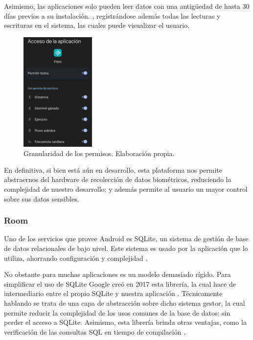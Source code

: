             
            Asimismo, las aplicaciones solo pueden leer datos con una antigüedad de 
            hasta 30 días previos a su instalación. \cite{noauthor_preguntas_nodate}, registrándose además todas las 
            lecturas y escrituras en el sistema, las cuales puede visualizar el usuario. \newline

            \begin{figure}[h]
                \centering
                \includegraphics[width=0.33\textwidth]{figures/Health connect permisos fitbit.jpg}
                \caption[Granularidad de los permisos.]
                {Granularidad de los permisos. Elaboración propia.}
                \label{figure:health_connect:granularidad_permisos}
            \end{figure}

            En definitiva, si bien está aún en desarrollo, esta plataforma nos permite abstraernos del hardware de
            recolección de datos biométricos, reduciendo la complejidad de nuestro desarrollo; y además permite al 
            usuario un mayor control sobre sus datos sensibles.
            
        \subsubsection{Room}
            Uno de los servicios que provee Android es SQLite, un sistema de gestión de base de datos relacionales de 
            bajo nivel. Este sistema es usado por la aplicación que lo utiliza, ahorrando configuración y complejidad
            \cite{recio_persistencia_2019}. \newline
            
            No obstante para muchas aplicaciones es un modelo demasiado rígido. Para simplificar el uso de SQLite
            Google creó en 2017 esta librería, la cual hace de intermediario entre el propio SQLite y nuestra 
            aplicación \cite{leiva_room_2020}. Técnicamente hablando se trata de una capa de abstracción sobre dicho
            sistema gestor, la cual permite reducir la complejidad de los usos comunes de la base de datos; sin perder
            el acceso a SQLite. Asimismo, esta librería brinda otras ventajas, como la verificación de las consultas
            SQL en tiempo de compilación \cite{noauthor_como_nodate}.

